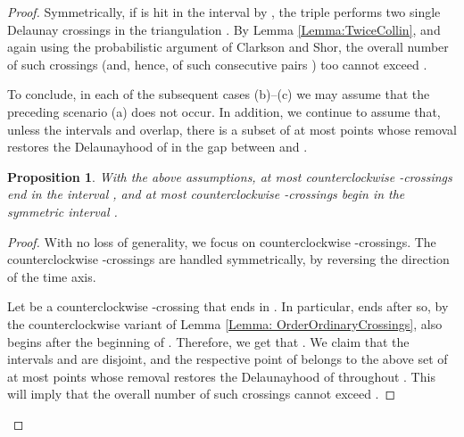 \documentclass[letter,11pt]{article}
\newtheorem{proposition}[theorem]{Proposition}
\begin{document}
\begin{proof}
Symmetrically, if  is hit in the interval  by , the triple  performs two single Delaunay crossings in the triangulation . By Lemma \ref{Lemma:TwiceCollin}, and again using the probabilistic argument of Clarkson and Shor, the overall number of such crossings  (and, hence, of such consecutive pairs ) too cannot exceed .


\bigskip
To conclude, in each of the subsequent cases (b)--(c) we may assume that the preceding scenario (a) does not occur. In addition, we continue to assume that, unless the intervals  and  overlap, there is a subset  of at most  points whose removal restores the Delaunayhood of  in the gap  between  and . 


\begin{proposition}\label{Prop:Balanced}
With the above assumptions, at most  counterclockwise -crossings  end in the interval , and at most  counterclockwise -crossings  begin in the symmetric interval .
\end{proposition}
\begin{proof}
With no loss of generality, we focus on counterclockwise -crossings. The counterclockwise -crossings are handled symmetrically, by reversing the direction of the time axis. 

Let  be a counterclockwise -crossing that ends in . In particular,  ends after  so, by the counterclockwise variant of Lemma \ref{Lemma: OrderOrdinaryCrossings},  also begins after the beginning  of . Therefore, we get that .
We claim that the intervals  and  are disjoint, and the respective point  of  belongs to the above set  of at most  points whose removal restores the Delaunayhood of  throughout . This will imply that the overall number of such crossings  cannot exceed . 


\end{proof}
\end{proof}
\end{document}
